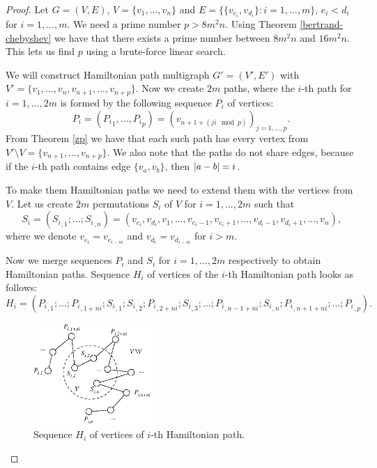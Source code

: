 \begin{proof}
Let $G = (V,E)$, $V = \{v_1, ..., v_n\}$ and $E = \{\{v_{e_i}, v_{d_i}\}: i = 1, ..., m\}$,
$e_i < d_i$ for $i=1,...,m$.
We need a prime number $p > 8m^2 n$.
Using Theorem \ref{bertrand-chebyshev} we have that there exists a prime number between $8m^2n$ and $16m^2 n$.
This lets us find $p$ using a brute-force linear search.

\sloppy
We will construct Hamiltonian path multigraph $G' = (V',E')$
with $V' = \{v_1, ..., v_n, v_{n+1}, ..., v_{n+p}\}$. 
Now we create $2m$ paths, where the $i$-th path for $i=1,...,2m$
is formed by the following sequence $P_i$ of vertices:
$$ P_i = ({P_i}_1, ..., {P_i}_p) =  (v_{n+1+(ji \mod p)})_{j=1,...,p} \text{.}$$ 
From Theorem \ref{zp} we have that each such path has every vertex from
$V' \setminus V = \{v_{n+1}, ..., v_{n+p}\}$.
We also note that the paths do not share edges,
because if the $i$-th path contains edge $\{v_a, v_b\}$, then $\left\vert a-b \right\vert = i$.

To make them Hamiltonian paths we need to extend them with the vertices from $V$.
Let us create $2m$ permutations $S_i$ of $V$ for $i=1,...,2m$ such that
$$S_i = ({S_i}_{,1}; ...; {S_i}_{,n}) =
(v_{e_i}, v_{d_i}, v_1, ..., v_{e_i-1}, v_{e_i+1}, ..., v_{d_i-1}, v_{d_i+1}, ..., v_n)\text{,}$$
where we denote $v_{e_i} = v_{e_{i-m}}$ and $v_{d_i} = v_{d_{i-m}}$ for $i>m$. 

Now we merge sequences $P_i$ and $S_i$ for $i=1,...,2m$ respectively to obtain Hamiltonian paths.
Sequence $H_i$ of vertices of the $i$-th Hamiltonian path looks as follows:
$$H_i = ({P_i}_{,1}; ...; {P_i}_{,1+ni}; {S_i}_{,1}; {S_i}_{,2}; {P_i}_{,2+ni}; {S_i}_{,3}; ...;
{P_i}_{,n-1+ni}; {S_i}_{,n}; {P_i}_{,n+1+ni}; ...; {P_i}_{,p}) \text{.}$$

\begin{figure}[h]
    \centering
    \includegraphics[width=0.4\textwidth]{path.eps}
    \caption{Sequence $H_i$ of vertices of $i$-th Hamiltonian path.}
    \label{fig:path}
\end{figure}


\end{proof}
